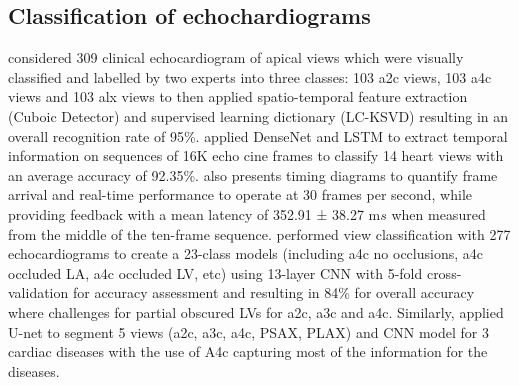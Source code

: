 \documentclass[mlabstract,twocolumn]{jmlr}
\begin{document}
\subsection{Classification of echochardiograms} \label{subsec:Nets_echochardiograms}
\citet{khamis2017} considered 309 clinical echocardiogram of apical views which were visually classified and labelled by two experts into three classes: 103 a2c views, 103 a4c views and 103 alx views to then applied spatio-temporal feature extraction (Cuboic Detector) and supervised learning dictionary (LC-KSVD) resulting in an overall recognition rate of 95\%.
\citet{woudenberg2018} applied DenseNet and LSTM to extract temporal information on sequences of 16K echo cine frames to classify 14 heart views with an average accuracy of 92.35\%.
\citet{woudenberg2018} also presents timing diagrams to quantify frame arrival and real-time performance to operate at 30 frames per second, while providing feedback with a mean latency of 352.91 ± 38.27 m$s$ when measured from the middle of the ten-frame sequence.
\citet{zhang2018} performed view classification with 277 echocardiograms to create a 23-class models (including a4c no occlusions, a4c occluded LA, a4c occluded LV, etc) using 13-layer CNN with 5-fold cross-validation for accuracy assessment and resulting in 84\% for overall accuracy where challenges for partial obscured LVs for a2c, a3c and a4c.
Similarly, \citet{zhang2018} applied U-net to segment 5 views (a2c, a3c, a4c, PSAX, PLAX) and CNN model for 3 cardiac diseases with the use of A4c capturing most of the information for the diseases.
\end{document}
